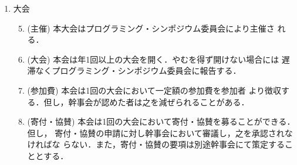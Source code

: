 \begin{enumerate}
\begin{enumerate}
\end{enumerate}
\newpage
\item	大会\\
%
\begin{enumerate}
\setcounter{enumii}{4}
\item	(主催) 本大会はプログラミング・シンポジウム委員会により主催さ
れる．\\
%
\item	(大会) 本会は年1回以上の大会を開く．やむを得ず開けない場合には
遅滞なくプログラミング・シンポジウム委員会に報告する．\\
%
\item (参加費) 本会は1回の大会において一定額の参加費を参加者
より徴収する．但し，幹事会が認めた者は之を減ぜられることがある．\\
%
\item (寄付・協賛) 本会は1回の大会において寄付・協賛を募ることができる．但し，
寄付・協賛の申請に対し幹事会において審議し，之を承認されなければな
らない．また，寄付・協賛の要項は別途幹事会にて策定することとする．\\
%
\end{enumerate}


\end{enumerate}
